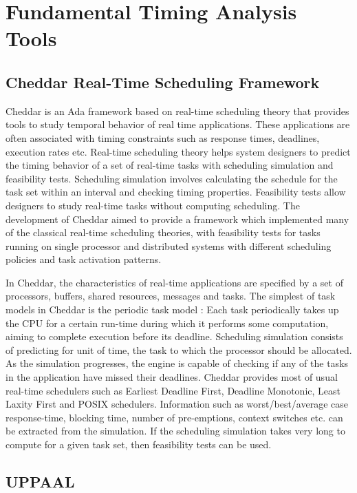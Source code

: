 \section{Fundamental Timing Analysis Tools}

\subsection{Cheddar Real-Time Scheduling Framework}

Cheddar \cite{Cheddar} is an Ada framework based on real-time scheduling theory that provides tools to study temporal behavior of real time applications. These applications are often associated with timing constraints such as response times, deadlines, execution rates etc. Real-time scheduling theory helps system designers to predict the timing behavior of a set of real-time tasks with scheduling simulation and feasibility tests. Scheduling simulation involves calculating the schedule for the task set within an interval and checking timing properties. Feasibility tests allow designers to study real-time tasks without computing scheduling. The development of Cheddar aimed to provide a framework which implemented many of the classical real-time scheduling theories, with feasibility tests for tasks running on single processor and distributed systems with different scheduling policies and task activation patterns. 

In Cheddar, the characteristics of real-time applications are specified by a set of processors, buffers, shared resources, messages and tasks. The simplest of task models in Cheddar is the periodic task model \cite{liu1973scheduling}: Each task periodically takes up the CPU for a certain run-time during which it performs some computation, aiming to complete execution before its deadline. Scheduling simulation consists of predicting for unit of time, the task to which the processor should be allocated. As the simulation progresses, the engine is capable of checking if any of the tasks in the application have missed their deadlines. Cheddar provides most of usual real-time schedulers such as Earliest Deadline First, Deadline Monotonic, Least Laxity First and POSIX schedulers. Information such as worst/best/average case response-time, blocking time, number of pre-emptions, context switches etc. can be extracted from the simulation. If the scheduling simulation takes very long to compute for a given task set, then feasibility tests can be used. 

\subsection{UPPAAL}

